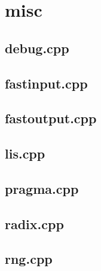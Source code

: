\section{misc}

\subsection{debug.cpp}


\subsection{fastinput.cpp}


\subsection{fastoutput.cpp}


\subsection{lis.cpp}


\subsection{pragma.cpp}


\subsection{radix.cpp}


\subsection{rng.cpp}


